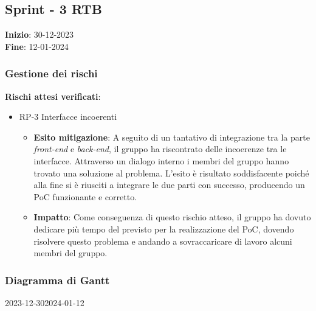 \subsection{Sprint - 3 RTB}
\textbf{Inizio}: 30-12-2023 \\
\textbf{Fine}: 12-01-2024

\subsubsection{Gestione dei rischi}
\textbf{Rischi attesi verificati}:

\begin{itemize}
	\item RP-3 Interfacce incoerenti
	      \begin{itemize}
		      \item \textbf{Esito mitigazione}: A seguito di un tantativo di integrazione tra la parte \textit{front-end} e \textit{back-end}, il gruppo ha riscontrato delle incoerenze tra le interfacce.
		            Attraverso un dialogo interno i membri del gruppo hanno trovato una soluzione al problema. L'esito è risultato soddisfacente poiché alla fine si è riusciti a integrare le due
		            parti con successo, producendo un PoC funzionante e corretto.

		      \item \textbf{Impatto}: Come conseguenza di questo rischio atteso, il gruppo ha dovuto dedicare più tempo del previsto per la realizzazione del PoC, dovendo risolvere
		            questo problema e andando a sovraccaricare di lavoro alcuni membri del gruppo.
	      \end{itemize}
\end{itemize}
\subsubsection{Diagramma di Gantt}

\begin{ganttchart}[
		x unit=0.6cm, %
		y unit chart=0.6cm,
		bar/.style={fill=blue!50},
		bar height=0.5,
		time slot format=isodate,
		time slot unit=day,
		vgrid,
		today=2024-01-8,
		today rule/.style={draw=red, ultra thick}
	]{2023-12-30}{2024-01-12}
	 \\
	 \\
	 \\
	 \\
	 \\
\end{ganttchart}

